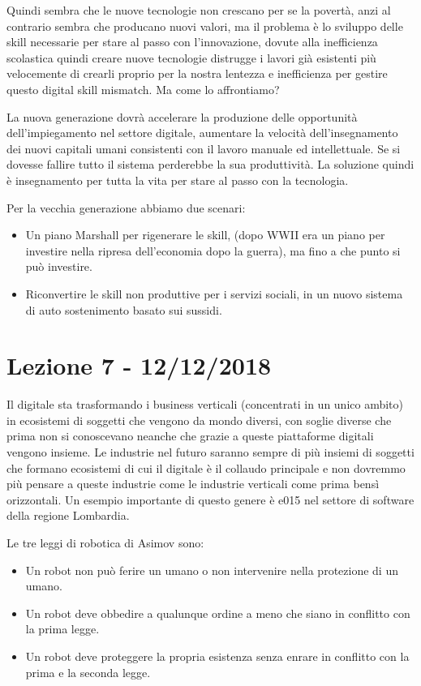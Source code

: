 \documentclass[a4page, 11pt]{article}
\begin{document}
Quindi sembra che le nuove tecnologie non crescano per se la povertà,
anzi al contrario sembra che producano nuovi valori, ma il problema è lo
sviluppo delle skill necessarie per stare al passo con l'innovazione,
dovute alla inefficienza scolastica quindi creare nuove tecnologie
distrugge i lavori già esistenti più velocemente di crearli proprio per
la nostra lentezza e inefficienza per gestire questo digital skill
mismatch. Ma come lo affrontiamo?

La nuova generazione dovrà accelerare la produzione delle opportunità
dell'impiegamento nel settore digitale, aumentare la velocità
dell'insegnamento dei nuovi capitali umani consistenti con il lavoro
manuale ed intellettuale. Se si dovesse fallire tutto il sistema
perderebbe la sua produttività. La soluzione quindi è insegnamento per
tutta la vita per stare al passo con la tecnologia.

Per la vecchia generazione abbiamo due scenari:

\begin{itemize}
	 
	\item
	Un piano Marshall per rigenerare le skill, (dopo WWII era un piano per
	investire nella ripresa dell'economia dopo la guerra), ma fino a che
	punto si può investire.
	\item
	Riconvertire le skill non produttive per i servizi sociali, in un
	nuovo sistema di auto sostenimento basato sui sussidi.
\end{itemize}
\section*{Lezione 7 - 12/12/2018}

Il digitale sta trasformando i business verticali (concentrati in un
unico ambito) in ecosistemi di soggetti che vengono da mondo diversi,
con soglie diverse che prima non si conoscevano neanche che grazie a
queste piattaforme digitali vengono insieme. Le industrie nel futuro
saranno sempre di più insiemi di soggetti che formano ecosistemi di cui
il digitale è il collaudo principale e non dovremmo più pensare a queste
industrie come le industrie verticali come prima bensì orizzontali. Un
esempio importante di questo genere è e015 nel settore di software della
regione Lombardia.

Le tre leggi di robotica di Asimov sono:

\begin{itemize}
	 
	\item
	Un robot non può ferire un umano o non intervenire nella protezione di
	un umano.
	\item
	Un robot deve obbedire a qualunque ordine a meno che siano in
	conflitto con la prima legge.
	\item
	Un robot deve proteggere la propria esistenza senza enrare in
	conflitto con la prima e la seconda legge.
\end{itemize}
\end{document}
